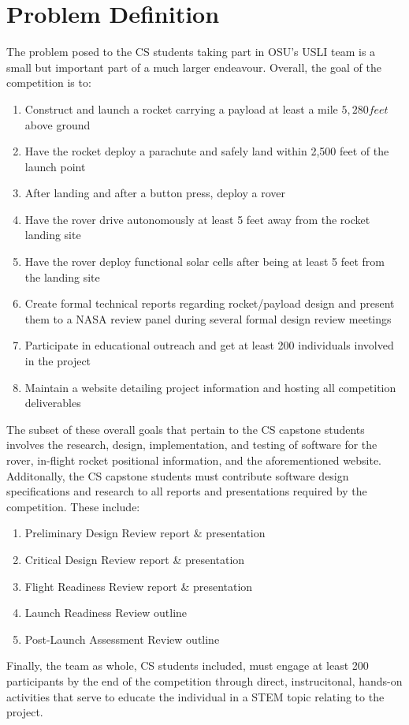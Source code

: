 \documentclass[onecolumn, draftclsnofoot,10pt, compsoc]{IEEEtran}
\begin{document}
\section{Problem Definition}
The problem posed to the CS students taking part in OSU's USLI team is a small but important part of a much larger endeavour. 
Overall, the goal of the competition is to: 
\begin{enumerate}
\item Construct and launch a rocket carrying a payload at least a mile \(5,280 feet\) above ground
\item Have the rocket deploy a parachute and safely land within 2,500 feet of the launch point
\item After landing and after a button press, deploy a rover
\item Have the rover drive autonomously at least 5 feet away from the rocket landing site
\item Have the rover deploy functional solar cells after being at least 5 feet from the landing site
\item Create formal technical reports regarding rocket/payload design and present them to a NASA review panel during several formal design review meetings
\item Participate in educational outreach and get at least 200 individuals involved in the project
\item Maintain a website detailing project information and hosting all competition deliverables
\end{enumerate}
\par The subset of these overall goals that pertain to the CS capstone students involves the research, design, implementation, and testing of software for the rover, in-flight rocket positional information, and the aforementioned website. 
Additonally, the CS capstone students must contribute software design specifications and research to all reports and presentations required by the competition. 
These include:
\begin{enumerate}
\item Preliminary Design Review report \& presentation
\item Critical Design Review report \& presentation
\item Flight Readiness Review report \& presentation
\item Launch Readiness Review outline
\item Post-Launch Assessment Review outline
\end{enumerate}
\par Finally, the team as whole, CS students included, must engage at least 200 participants by the end of the competition through direct, instrucitonal, hands-on activities that serve to educate the individual in a STEM topic relating to the project.
\end{document}
